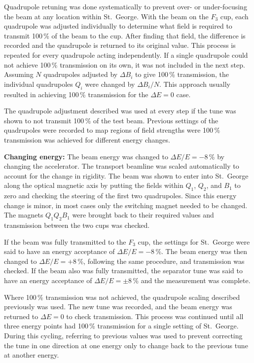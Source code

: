 Quadrupole retuning was done systematically to prevent over- or under-focusing
the beam at any location within St.\ George. With the beam on the $F_3$ cup,
each quadrupole was adjusted individually to determine what field is required
to transmit 100\,\% of the beam to the cup. After finding that field, the
difference is recorded and the quadrupole is returned to its original value.
This process is repeated for every quadrupole acting independently. If a single
quadrupole could not achieve 100\,\% transmission on its own, it was not included
in the next step. Assuming $N$ quadrupoles adjusted by $\Delta B_i$ to give
100\,\% transmission, the individual quadrupoles $Q_i$ were changed by
$\Delta B_i / N$. This approach usually resulted in achieving 100\,\%
transmission for the $\Delta E = 0$ case.

The quadrupole adjustment described was used at every step if the tune was
shown to not transmit 100\,\% of the test beam. Previous settings of the
quadrupoles were recorded to map regions of field strengths were 100\,\%
transmission was achieved for different energy changes.

\textbf{Changing energy:}
The beam energy was changed to $\Delta E/E = -8$\,\% by changing the accelerator.
The transport beamline was scaled automatically to account for the change in
rigidity. The beam was shown to enter into St.\ George along the optical
magnetic axis by putting the fields within $Q_1$, $Q_2$, and $B_1$ to zero and
checking the steering of the first two quadrupoles. Since this energy change is
minor, in most cases only the switching magnet needed to be changed. The
magnets $Q_1Q_2B_1$ were brought back to their required values and transmission
between the two cups was checked.

If the beam was fully transmitted to the $F_3$ cup, the settings for St.\
George were said to have an energy acceptance of $\Delta E/E = -8$\,\%. The beam
energy was then changed to $\Delta E/E = + 8$\,\%, following the same procedure,
and transmission was checked. If the beam also was fully transmitted, the
separator tune was said to have an energy acceptance of $\Delta E/E = \pm 8$\,\%
and the measurement was complete.

Where 100\,\% transmission was not achieved, the quadrupole scaling described
previously was used. The new tune was recorded, and the beam energy was
returned to $\Delta E = 0$ to check transmission. This process was continued
until all three energy points had 100\,\% transmission for a single setting of
St.\ George. During this cycling, referring to previous values was used to
prevent correcting the tune in one direction at one energy only to change back
to the previous tune at another energy.

